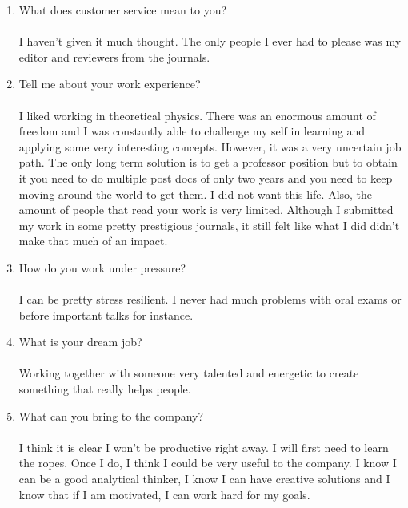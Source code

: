 \documentclass[12pt,a4paper,twoside]{article}
\begin{document}
\begin{enumerate}
		\item What does customer service mean to you?\\\\
		I haven't given it much thought. The only people I ever had to please was my editor and reviewers from the journals.
		\item Tell me about your work experience?\\\\
		I liked working in theoretical physics. There was an enormous amount of freedom and I was constantly able to challenge my self in learning and applying some very interesting concepts. However, it was a very uncertain job path. The only long term solution is to get a professor position but to obtain it you need to do multiple post docs of only two years and you need to keep moving around the world to get them. I did not want this life. Also, the amount of people that read your work is very limited. Although I submitted my work in some pretty prestigious journals, it still felt like what I did didn't make that much of an impact.
		\item How do you work under pressure?\\\\
		I can be pretty stress resilient. I never had much problems with oral exams or before important talks for instance.
		\item What is your dream job?\\\\
		Working together with someone very talented and energetic to create something that really helps people.
		\item What can you bring to the company?\\\\
		I think it is clear I won't be productive right away. I will first need to learn the ropes. Once I do, I think I could be very useful to the company. I know I can be a good analytical thinker, I know I can have creative solutions and I know that if I am motivated, I can work hard for my goals.
	\end{enumerate}
\end{document}
